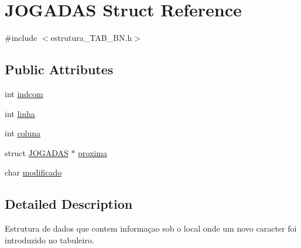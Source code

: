 \hypertarget{structJOGADAS}{\section{J\-O\-G\-A\-D\-A\-S Struct Reference}
\label{structJOGADAS}
}


{\ttfamily \#include $<$estrutura\-\_\-\-T\-A\-B\-\_\-\-B\-N.\-h$>$}

\subsection*{Public Attributes}
\begin{DoxyCompactItemize}
\item 
int \hyperlink{structJOGADAS_a206a51faab310b88ead47ae8bd45c005}{indcom}
\item 
int \hyperlink{structJOGADAS_a967eba2150e21971402055c08864f81e}{linha}
\item 
int \hyperlink{structJOGADAS_a28827d11a796524d7c3f836a34a9b28c}{coluna}
\item 
struct \hyperlink{structJOGADAS}{J\-O\-G\-A\-D\-A\-S} $\ast$ \hyperlink{structJOGADAS_a5e94fadbce9d65532b484d6d36bbce7d}{proxima}
\item 
char \hyperlink{structJOGADAS_a66f982d3f9fb083c8289819db4e1f892}{modificado}
\end{DoxyCompactItemize}


\subsection{Detailed Description}
Estrutura de dados que contem informaçao sob o local onde um novo caracter foi introduzido no tabuleiro. 

